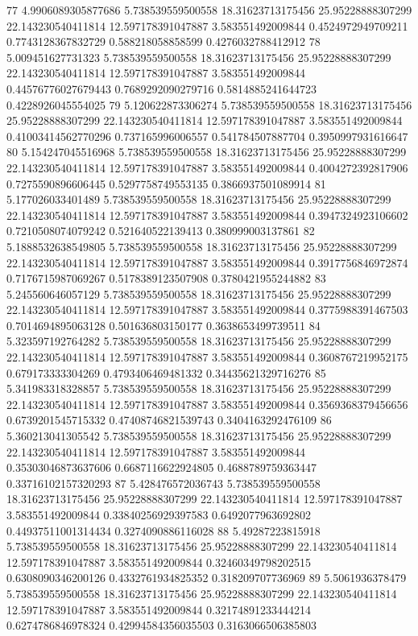 {77 4.9906089305877686 5.738539559500558 18.31623713175456 25.95228888307299 22.143230540411814 12.597178391047887 3.583551492009844 0.4524972949709211 0.7743128367832729 0.588218058858599 0.4276032788412912
78 5.009451627731323 5.738539559500558 18.31623713175456 25.95228888307299 22.143230540411814 12.597178391047887 3.583551492009844 0.44576776027679443 0.7689292090279716 0.5814885241644723 0.4228926045554025
79 5.120622873306274 5.738539559500558 18.31623713175456 25.95228888307299 22.143230540411814 12.597178391047887 3.583551492009844 0.41003414562770296 0.737165996006557 0.541784507887704 0.3950997931616647
80 5.154247045516968 5.738539559500558 18.31623713175456 25.95228888307299 22.143230540411814 12.597178391047887 3.583551492009844 0.4004272392817906 0.7275590896606445 0.5297758749553135 0.3866937501089914
81 5.177026033401489 5.738539559500558 18.31623713175456 25.95228888307299 22.143230540411814 12.597178391047887 3.583551492009844 0.3947324923106602 0.7210508074079242 0.521640522139413 0.380999003137861
82 5.1888532638549805 5.738539559500558 18.31623713175456 25.95228888307299 22.143230540411814 12.597178391047887 3.583551492009844 0.3917756846972874 0.7176715987069267 0.5178389123507908 0.3780421955244882
83 5.245560646057129 5.738539559500558 18.31623713175456 25.95228888307299 22.143230540411814 12.597178391047887 3.583551492009844 0.3775988391467503 0.7014694895063128 0.501636803150177 0.3638653499739511
84 5.323597192764282 5.738539559500558 18.31623713175456 25.95228888307299 22.143230540411814 12.597178391047887 3.583551492009844 0.3608767219952175 0.679173333304269 0.4793406469481332 0.34435621329716276
85 5.341983318328857 5.738539559500558 18.31623713175456 25.95228888307299 22.143230540411814 12.597178391047887 3.583551492009844 0.3569368379456656 0.6739201545715332 0.47408746821539743 0.3404163292476109
86 5.360213041305542 5.738539559500558 18.31623713175456 25.95228888307299 22.143230540411814 12.597178391047887 3.583551492009844 0.35303046873637606 0.6687116622924805 0.4688789759363447 0.33716102157320293
87 5.428476572036743 5.738539559500558 18.31623713175456 25.95228888307299 22.143230540411814 12.597178391047887 3.583551492009844 0.33840256929397583 0.6492077963692802 0.44937511001314434 0.3274090886116028
88 5.49287223815918 5.738539559500558 18.31623713175456 25.95228888307299 22.143230540411814 12.597178391047887 3.583551492009844 0.32460349798202515 0.6308090346200126 0.4332761934825352 0.318209707736969
89 5.5061936378479 5.738539559500558 18.31623713175456 25.95228888307299 22.143230540411814 12.597178391047887 3.583551492009844 0.32174891233444214 0.6274786846978324 0.42994584356035503 0.3163066506385803
}
